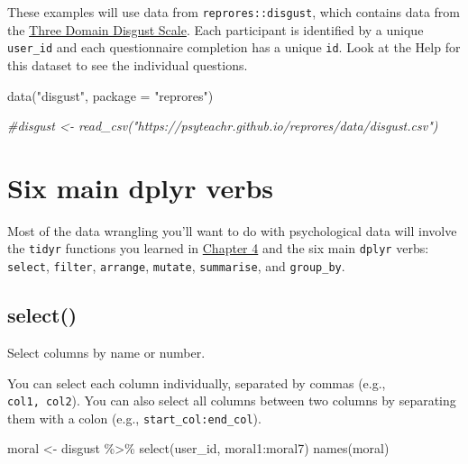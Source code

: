 \documentclass[
  oneside]{book}
\newenvironment{Shaded}{\begin{snugshade}}{\end{snugshade}}
\newcommand{\AttributeTok}[1]{\textcolor[rgb]{0.77,0.63,0.00}{#1}}
\newcommand{\CommentTok}[1]{\textcolor[rgb]{0.56,0.35,0.01}{\textit{#1}}}
\newcommand{\FunctionTok}[1]{\textcolor[rgb]{0.00,0.00,0.00}{#1}}
\newcommand{\NormalTok}[1]{#1}
\newcommand{\OtherTok}[1]{\textcolor[rgb]{0.56,0.35,0.01}{#1}}
\newcommand{\SpecialCharTok}[1]{\textcolor[rgb]{0.00,0.00,0.00}{#1}}
\newcommand{\StringTok}[1]{\textcolor[rgb]{0.31,0.60,0.02}{#1}}
\begin{document}
These examples will use data from \texttt{reprores::disgust}, which contains data from the \href{http://digitalrepository.unm.edu/cgi/viewcontent.cgi?article=1139\&context=psy_etds}{Three Domain Disgust Scale}. Each participant is identified by a unique \texttt{user\_id} and each questionnaire completion has a unique \texttt{id}. Look at the Help for this dataset to see the individual questions.

\begin{Shaded}
\begin{Highlighting}[]
\FunctionTok{data}\NormalTok{(}\StringTok{"disgust"}\NormalTok{, }\AttributeTok{package =} \StringTok{"reprores"}\NormalTok{)}

\CommentTok{\#disgust \textless{}{-} read\_csv("https://psyteachr.github.io/reprores/data/disgust.csv")}
\end{Highlighting}
\end{Shaded}

\hypertarget{six-main-dplyr-verbs}{%
\section{Six main dplyr verbs}\label{six-main-dplyr-verbs}}

Most of the data wrangling you'll want to do with psychological data will involve the \texttt{tidyr} functions you learned in \protect\hyperlink{tidyr}{Chapter 4} and the six main \texttt{dplyr} verbs: \texttt{select}, \texttt{filter}, \texttt{arrange}, \texttt{mutate}, \texttt{summarise}, and \texttt{group\_by}.

\hypertarget{select}{%
\subsection{select()}\label{select}}

Select columns by name or number.

You can select each column individually, separated by commas (e.g., \texttt{col1,\ col2}). You can also select all columns between two columns by separating them with a colon (e.g., \texttt{start\_col:end\_col}).

\begin{Shaded}
\begin{Highlighting}[]
\NormalTok{moral }\OtherTok{\textless{}{-}}\NormalTok{ disgust }\SpecialCharTok{\%\textgreater{}\%} \FunctionTok{select}\NormalTok{(user\_id, moral1}\SpecialCharTok{:}\NormalTok{moral7)}
\FunctionTok{names}\NormalTok{(moral)}
\end{Highlighting}
\end{Shaded}
\end{document}
